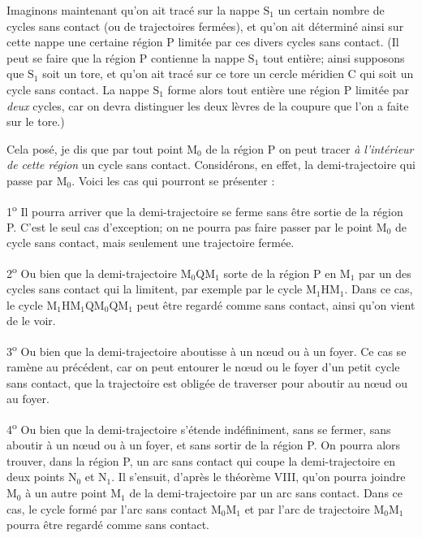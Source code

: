 \documentclass[11pt]{article}
\begin{document}
Imaginons maintenant qu’on ait tracé sur la nappe $\mathrm{S}_1$ un certain nombre de cycles sans contact (ou de trajectoires fermées), et qu’on ait déterminé ainsi sur cette nappe une certaine région P limitée par ces divers cycles sans contact. (Il peut se faire que la région P contienne la nappe $\mathrm{S}_1$ tout entière; ainsi supposons que $\mathrm{S}_1$ soit un tore, et qu’on ait tracé sur ce tore un cercle méridien C qui soit un cycle sans contact. La nappe $\mathrm{S}_1$ forme alors tout entière une région P limitée par \emph{deux} cycles, car on devra distinguer les deux lèvres de la coupure que l’on a faite sur le tore.)

Cela posé, je dis que par tout point $\mathrm{M}_0$ de la région P on peut tracer \emph{à l’intérieur de cette région} un cycle sans contact. Considérons, en effet, la demi-trajectoire qui passe par $\mathrm{M}_0$. Voici les cas qui pourront se présenter :

1\textsuperscript{o} Il pourra arriver que la demi-trajectoire se ferme sans être sortie de la région P. C’est le seul cas d’exception; on ne pourra pas faire passer par le point $\mathrm{M}_0$ de cycle sans contact, mais seulement une trajectoire fermée.

2\textsuperscript{o} Ou bien que la demi-trajectoire $\mathrm{M}_0\mathrm{Q}\mathrm{M}_1$ sorte de la région P en $\mathrm{M}_1$ par un des cycles sans contact qui la limitent, par exemple par le cycle $\mathrm{M}_1\mathrm{H}\mathrm{M}_1$. Dans ce cas, le cycle $\mathrm{M}_1\mathrm{H}\mathrm{M}_1\mathrm{Q}\mathrm{M}_0\mathrm{Q}\mathrm{M}_1$ peut être regardé comme sans contact, ainsi qu’on vient de le voir.

3\textsuperscript{o} Ou bien que la demi-trajectoire aboutisse à un nœud ou à un foyer. Ce cas se ramène au précédent, car on peut entourer le nœud ou le foyer d’un petit cycle sans contact, que la trajectoire est obligée de traverser pour aboutir au nœud ou au foyer.

4\textsuperscript{o} Ou bien que la demi-trajectoire s’étende indéfiniment, sans se fermer, sans aboutir à un nœud ou à un foyer, et sans sortir de la région P. On pourra alors trouver, dans la région P, un arc sans contact qui coupe la demi-trajectoire en deux points $\mathrm{N}_0$ et $\mathrm{N}_1$. Il s’ensuit, d’après le théorème VIII, qu’on pourra joindre $\mathrm{M}_0$ à un autre point $\mathrm{M}_1$ de la demi-trajectoire par un arc sans contact. Dans ce cas, le cycle formé par l’arc sans contact $\mathrm{M}_0\mathrm{M}_1$ et par l’arc de trajectoire $\mathrm{M}_0\mathrm{M}_1$ pourra être regardé comme sans contact.
\end{document}

